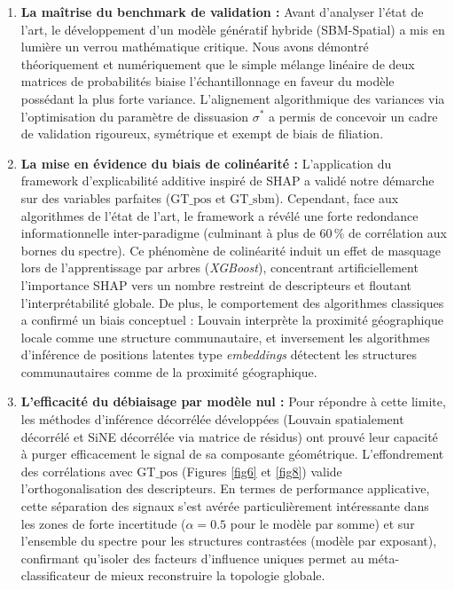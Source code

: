 \begin{enumerate}
    \item \textbf{La maîtrise du benchmark de validation :} Avant d'analyser l'état de l'art, le développement d'un modèle génératif hybride (SBM-Spatial) a mis en lumière un verrou mathématique critique. Nous avons démontré théoriquement et numériquement que le simple mélange linéaire de deux matrices de probabilités biaise l'échantillonnage en faveur du modèle possédant la plus forte variance. L'alignement algorithmique des variances via l'optimisation du paramètre de dissuasion $\sigma^*$ a permis de concevoir un cadre de validation rigoureux, symétrique et exempt de biais de filiation.
    \item \textbf{La mise en évidence du biais de colinéarité :} L'application du framework d'explicabilité additive inspiré de SHAP a validé notre démarche sur des variables parfaites ($\text{GT\_pos}$ et $\text{GT\_sbm}$). Cependant, face aux algorithmes de l'état de l'art, le framework a révélé une forte redondance informationnelle inter-paradigme (culminant à plus de $60\,\%$ de corrélation aux bornes du spectre). Ce phénomène de colinéarité induit un effet de masquage lors de l'apprentissage par arbres (\textit{XGBoost}), concentrant artificiellement l'importance SHAP vers un nombre restreint de descripteurs et floutant l'interprétabilité globale. De plus, le comportement des algorithmes classiques a confirmé un biais conceptuel : Louvain interprète la proximité géographique locale comme une structure communautaire, et inversement les algorithmes d'inférence de positions latentes type \textit{embeddings} détectent les structures communautaires comme de la proximité géographique.
    \item \textbf{L'efficacité du débiaisage par modèle nul :} Pour répondre à cette limite, les méthodes d'inférence décorrélée développées (Louvain spatialement décorrélé et SiNE décorrélée via matrice de résidus) ont prouvé leur capacité à purger efficacement le signal de sa composante géométrique. L'effondrement des corrélations avec $\text{GT\_pos}$ (Figures \ref{fig6} et \ref{fig8}) valide l'orthogonalisation des descripteurs. En termes de performance applicative, cette séparation des signaux s'est avérée particulièrement intéressante dans les zones de forte incertitude ($\alpha = 0.5$ pour le modèle par somme) et sur l'ensemble du spectre pour les structures contrastées (modèle par exposant), confirmant qu'isoler des facteurs d'influence uniques permet au méta-classificateur de mieux reconstruire la topologie globale.
\end{enumerate}

